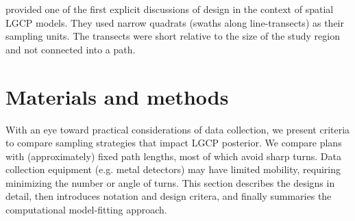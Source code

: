 \documentclass[review]{elsarticle}
\begin{document}
\citet{liuvanhatalo} provided one of the first explicit discussions of design
in the context of spatial LGCP models. They used narrow quadrats (swaths along
line-transects) as their sampling units. The transects were short relative to
the size of the study region and not connected into a path.







\section{Materials and methods}


With an eye toward practical considerations of data collection, we present
criteria to compare sampling strategies that impact LGCP posterior. We compare
plans with (approximately) fixed path lengths, most of which avoid sharp turns.
Data collection equipment (e.g. metal detectors) may have limited mobility,
requiring minimizing the number or angle of turns. This section describes the
designs in detail, then introduces notation and design critera, and finally
summaries the computational model-fitting approach.
\end{document}
